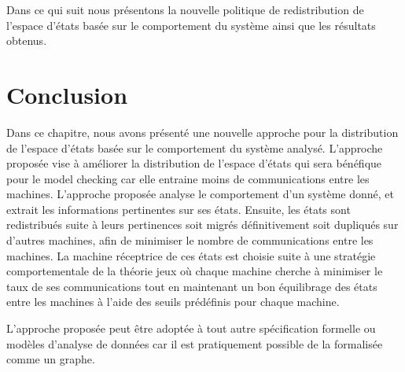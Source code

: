Dans ce qui suit nous présentons la nouvelle politique de redistribution de l’espace d’états basée sur le comportement du système ainsi que les résultats obtenus. 
 
 



\section{Conclusion}
Dans ce chapitre, nous avons présenté une nouvelle approche pour la distribution de l’espace d'états basée sur le comportement du système analysé. L’approche proposée vise à améliorer la distribution de l'espace d'états qui sera bénéfique pour le model checking car elle entraine moins de communications entre les machines. L’approche proposée analyse le comportement d’un système donné, et extrait les informations pertinentes sur ses états. Ensuite, les états sont redistribués suite à leurs pertinences soit migrés définitivement soit dupliqués sur d’autres machines, afin de minimiser le nombre de communications entre les machines. La machine réceptrice de ces états est choisie suite à une stratégie comportementale de la théorie jeux où chaque machine cherche à minimiser le taux de ses communications tout en maintenant un bon équilibrage des états entre les machines à l’aide des seuils prédéfinis pour chaque machine.

L’approche proposée peut être adoptée à tout autre spécification formelle ou modèles d'analyse de données car il est pratiquement possible de la formalisée comme un graphe. 